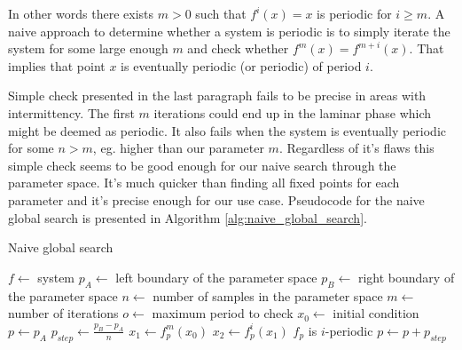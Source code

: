 In other words there exists $m > 0$ such that $f^{i}(x)=x$ is periodic for $i \geq m$.
A naive approach to determine whether a system is periodic is to simply iterate the system for some large enough $m$ and check whether $f^{m}(x)=f^{m+i}(x)$.
That implies that point $x$ is eventually periodic (or periodic) of period $i$.
\par
Simple check presented in the last paragraph fails to be precise in areas with intermittency.
The first $m$ iterations could end up in the laminar phase which might be deemed as periodic.
It also fails when the system is eventually periodic for some $n > m$, eg. higher than our parameter $m$.
Regardless of it's flaws this simple check seems to be good enough for our naive search through the parameter space.
It's much quicker than finding all fixed points for each parameter and it's precise enough for our use case.
Pseudocode for the naive global search is presented in Algorithm \ref{alg:naive_global_search}.

\begin{algorithm}[!h]
    \caption{Naive global search}
    \label{alg:naive_global_search}
    \begin{algorithmic}[1]
        \Statex $f \gets$ system
        \Statex $p_{A} \gets$ left boundary of the parameter space
        \Statex $p_{B} \gets$ right boundary of the parameter space
        \Statex $n \gets$ number of samples in the parameter space
        \Statex $m \gets$ number of iterations
        \Statex $o \gets$ maximum period to check
        \Statex $x_0 \gets$ initial condition
        \State $p \gets p_{A}$
        \State $p_{step} \gets \frac{p_{B} - p_{A}}{n}$
            \State $x_1 \gets f_{p}^{m}(x_0)$
                \State $x_2 \gets f_{p}^{i}(x_1)$
                    \State $f_p$ is $i$-periodic
                \EndIf
            \EndFor
            \State $p \gets p + p_{step}$
        \EndWhile
    \end{algorithmic}
\end{algorithm}

